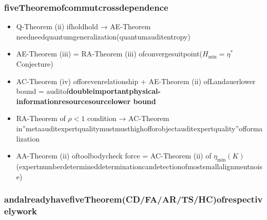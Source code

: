 \documentclass[
  12pt,
]{article}
\providecommand{\tightlist}{%
  \setlength{\itemsep}{0pt}\setlength{\parskip}{0pt}}
\begin{document}
\subsubsection{fiveTheoremofcommutcrossdependence}\label{ux4e94ux5b9aux7406ux7684ux4ea4ux53c9ux4f9dux8d56}

\begin{itemize}
\tightlist
\item
  Q-Theorem (ii) ifholdhold → AE-Theorem needneedquantumgeneralization(quantumauditentropy)
\item
  AE-Theorem (iii) = RA-Theorem (iii) ofconvergesuitpoint(\(H_{\min} = \eta^*\)
  Conjecture)
\item
  AC-Theorem (iv) offorevenrelationship + AE-Theorem (ii) ofLandauerlower bound =
  auditof\textbf{doubleimportantphysical-informationresourcesourcelower bound}
\item
  RA-Theorem of \(\rho < 1\) condition → AC-Theorem
  in''metaauditexpertqualitymustmusthighofforobjectauditexpertquality''offormalization
\item
  AA-Theorem (ii) oftoolbodycheck force = AC-Theorem (ii) of
  \(\eta_{\min}(K)\)(expertnumberdetermineddeterminationcandetectionofmostsmallalignmentnoise)
\end{itemize}

\subsubsection{andalreadyhavefiveTheorem(CD/FA/AR/TS/HC)ofrespectivelywork}\label{ux4e0eux5df2ux6709ux4e94ux5b9aux7406cdfaartshcux7684ux5206ux5de5}
\end{document}
